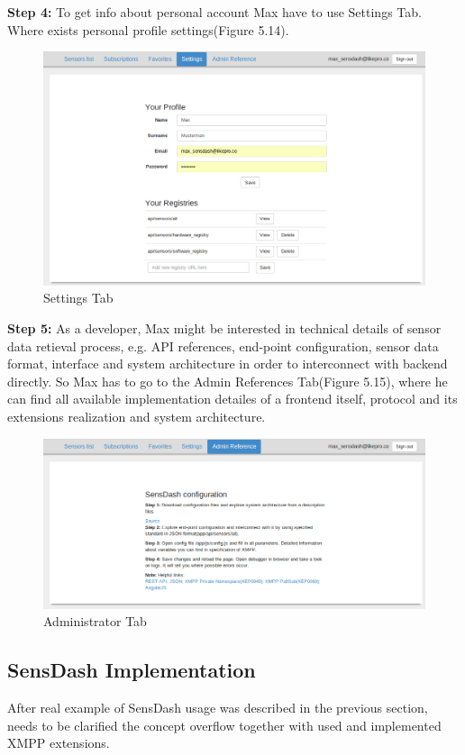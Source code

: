 \textbf{Step 4:} To get info about personal account Max have to use Settings Tab. Where exists personal profile settings(Figure 5.14). 
\begin{figure}[!ht]
\centering
\includegraphics[scale=0.6]{Screenshots/UseCaseScreenshot6.png}   
\caption[Settings Tab]{Settings Tab}                         
\end{figure}

\textbf{Step 5:} As a developer, Max might be interested in technical details of sensor data retieval process, e.g. API references, end-point configuration, sensor data format, interface and system architecture in order to interconnect with backend directly. So Max has to go to the Admin References Tab(Figure 5.15), where he can find all available implementation detailes of a frontend itself, protocol and its extensions realization and system architecture. 
\begin{figure}[!ht]
\centering
\includegraphics[scale=0.6]{Screenshots/UseCaseReferences.png}   
\caption[Administrator Tab]{Administrator Tab}                         
\end{figure}

\subsection{SensDash Implementation}
After real example of SensDash usage was described in the previous section, needs to be clarified the concept overflow together with used and implemented XMPP extensions.

